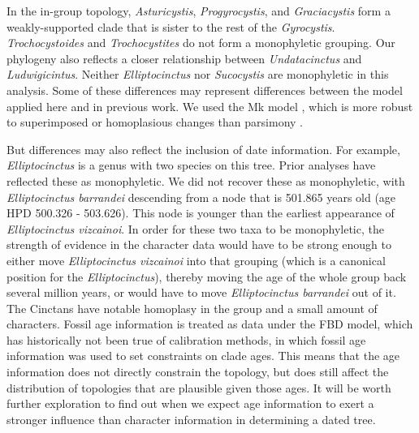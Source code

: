 \documentclass{article}
\begin{document}
In the in-group topology, \textit{Asturicystis}, \textit{Progyrocystis}, and \textit{Graciacystis} form a weakly-supported clade that is sister to the rest of the \textit{Gyrocystis}.
\textit{Trochocystoides} and \textit{Trochocystites} do not form a monophyletic grouping. 
Our phylogeny also reflects a closer relationship between \textit{Undatacinctus} and \textit{Ludwigicintus}. 
Neither \textit{Elliptocinctus} nor \textit{Sucocystis} are monophyletic in this analysis.
Some of these differences may represent differences between the model applied here and in previous work.
We used the Mk model \citep{Lewis2001}, which is more robust to superimposed or homoplasious changes than parsimony \citep{Felsenstein1978, Wright2014}.

But differences may also reflect the inclusion of date information.
For example, \textit{Elliptocinctus} is a genus with two species on this tree. 
Prior analyses have reflected these as monophyletic.
We did not recover these as monophyletic, with \textit{Elliptocinctus barrandei} descending from a node that is 501.865 years old (age HPD 500.326 - 503.626).
This node is younger than the earliest appearance of \textit{Elliptocinctus vizcainoi}.
In order for these two taxa to be monophyletic, the strength of evidence in the character data would have to be strong enough to either move \textit{Elliptocinctus vizcainoi} into that grouping (which is a canonical position for the \textit{Elliptocinctus}), thereby moving the age of the whole group back several million years, or would have to move \textit{Elliptocinctus barrandei} out of it.
The Cinctans have notable homoplasy in the group and a small amount of characters.
Fossil age information is treated as data under the FBD model, which has historically not been true of calibration methods, in which fossil age information was used to set constraints on clade ages.
This means that the age information does not directly constrain the topology, but does still affect the distribution of topologies that are plausible given those ages. 
It will be worth further exploration to find out when we expect age information to exert a stronger influence than character information in determining a dated tree.
\end{document}
